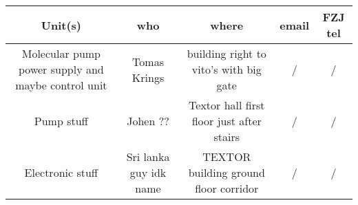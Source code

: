 \begin{center}
\begin{tabular}{||c c c c c||} 
 \hline
 Unit(s) & who & where & email & FZJ tel \\ [0.5ex] 
 \hline\hline
 Molecular pump power supply and maybe control unit & Tomas Krings & building right to vito's with big gate& / & / \\ 
 Pump stuff & Johen ?? & Textor hall first floor just after stairs & / & / \\ 
 Electronic stuff & Sri lanka guy idk name & TEXTOR building ground floor corridor& / & / \\ 
 \hline
\end{tabular}
\end{center}
